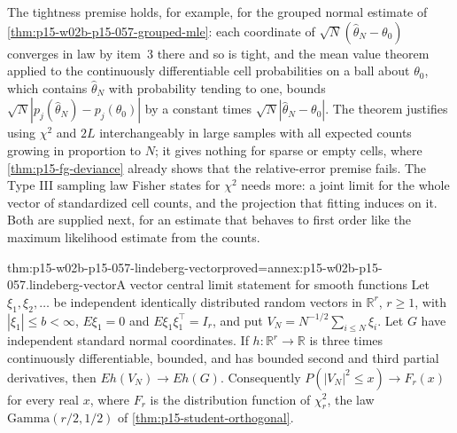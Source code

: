 The tightness premise holds, for example, for the grouped normal estimate
of \cref{thm:p15-w02b-p15-057-grouped-mle}: each coordinate of
\(\sqrt N(\widehat\theta_N-\theta_0)\) converges in law by item~3 there and
so is tight, and the mean value theorem applied to the continuously
differentiable cell probabilities on a ball about \(\theta_0\), which
contains \(\widehat\theta_N\) with probability tending to one, bounds
\(\sqrt N|p_j(\widehat\theta_N)-p_j(\theta_0)|\) by a constant times
\(\sqrt N|\widehat\theta_N-\theta_0|\). The theorem justifies using \(\chi^2\) and \(2L\)
interchangeably in large samples with all expected counts growing in
proportion to \(N\); it gives nothing for sparse or empty cells, where
\cref{thm:p15-fg-deviance} already shows that the relative-error premise
fails. The Type III sampling law Fisher states for \(\chi^2\) needs more:
a joint limit for the whole vector of standardized cell counts, and the
projection that fitting induces on it. Both are supplied next, for an
estimate that behaves to first order like the maximum likelihood estimate
from the counts.

\begin{hblemma}{thm:p15-w02b-p15-057-lindeberg-vector}{proved=annex:p15-w02b-p15-057.lindeberg-vector}{A vector central limit statement for smooth functions}
Let \(\xi_1,\xi_2,\ldots\) be independent identically distributed random
vectors in \(\mathbb R^r\), \(r\geq1\), with \(|\xi_1|\leq b<\infty\),
\(E\xi_1=0\) and \(E\xi_1\xi_1^{\top}=I_r\), and put
\(V_N=N^{-1/2}\sum_{i\leq N}\xi_i\). Let \(G\) have independent standard
normal coordinates. If \(h:\mathbb R^r\to\mathbb R\) is three times
continuously differentiable, bounded, and has bounded second and third
partial derivatives, then \(Eh(V_N)\to Eh(G)\). Consequently
\(P(|V_N|^2\leq x)\to F_r(x)\) for every real \(x\), where \(F_r\) is the
distribution function of \(\chi^2_r\), the law
\(\mathrm{Gamma}(r/2,1/2)\) of \cref{thm:p15-student-orthogonal}.
\end{hblemma}

